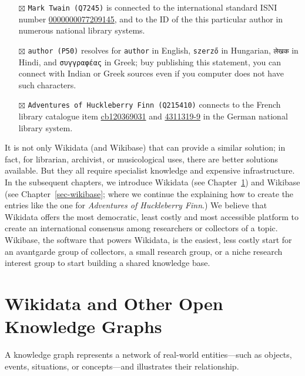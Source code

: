 \documentclass[
  letterpaper,
  DIV=11,
  numbers=noendperiod]{scrreprt}
\begin{document}
\begin{itemize}
\item[$\boxtimes$]
  \texttt{Mark\ Twain\ (Q7245)} is connected to the international
  standard ISNI number
  \href{https://isni.org/isni/0000000077209145}{0000000077209145}, and
  to the ID of the this particular author in numerous national library
  systems.
\item[$\boxtimes$]
  \texttt{author\ (P50)} resolves for \texttt{author} in English,
  \texttt{szerző} in Hungarian, \texttt{लेखक} in Hindi, and
  \texttt{συγγραφέας} in Greek; buy publishing this statement, you can
  connect with Indian or Greek sources even if you computer does not
  have such characters.
\item[$\boxtimes$]
  \texttt{Adventures\ of\ Huckleberry\ Finn\ (Q215410)} connects to the
  French library catalogue item
  \href{https://catalogue.bnf.fr/ark:/12148/cb120369031}{cb120369031}
  and \href{https://d-nb.info/gnd/4311319-9}{4311319-9} in the German
  national library system.
\end{itemize}

It is not only Wikidata (and Wikibase) that can provide a similar
solution; in fact, for librarian, archivist, or musicological uses,
there are better solutions available. But they all require specialist
knowledge and expensive infrastructure. In the subsequent chapters, we
introduce Wikidata (see Chapter~\ref{sec-wikidata-open-graph}) and
Wikibase (see Chapter~\ref{sec-wikibase}; where we continue the
explaining how to create the entries like the one for \emph{Adventures
of Huckleberry Finn}.) We believe that Wikidata offers the most
democratic, least costly and most accessible platform to create an
international consensus among researchers or collectors of a topic.
Wikibase, the software that powers Wikidata, is the easiest, less costly
start for an avantgarde group of collectors, a small research group, or
a niche research interest group to start building a shared knowledge
base.


\chapter{Wikidata and Other Open Knowledge
Graphs}\label{sec-wikidata-open-graph}

A knowledge graph represents a network of real-world entities---such as
objects, events, situations, or concepts---and illustrates their
relationship.
\end{document}
